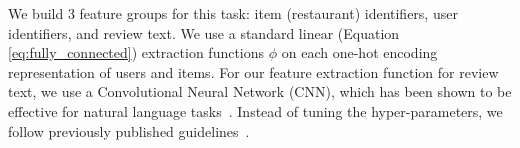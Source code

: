 \documentclass{article}
\renewcommand{\cite}[1]{\citep{#1}}
\begin{document}
We build 3 feature groups for this task: item (restaurant) identifiers, user identifiers, and review text.
We use a standard linear (Equation \ref{eq:fully_connected}) extraction functions $\phi$  on each one-hot encoding representation of users and items.
For our feature extraction function for review text, we use  a Convolutional Neural Network (CNN), which  has been shown to be effective for natural language tasks~\cite{DBLP:journals/corr/KalchbrennerGB14,tagspace}.
Instead of tuning the hyper-parameters, we follow previously published  guidelines~\cite{zhang2015sensitivity}.

\end{document}
